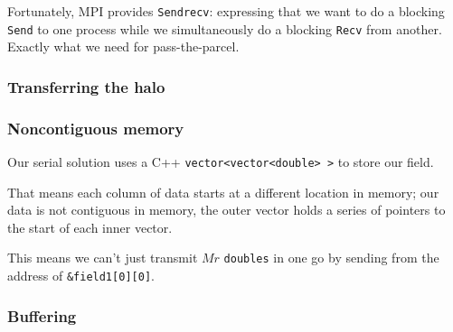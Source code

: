 Fortunately, MPI provides \texttt{Sendrecv}: expressing that we want to
do a blocking \texttt{Send} to one process while we simultaneously do a
blocking \texttt{Recv} from another. Exactly what we need for
pass-the-parcel.

\subsubsection{Transferring the halo}\label{transferring-the-halo-1}

\begin{Shaded}
\begin{Highlighting}[]

 
\NormalTok{\}}
\end{Highlighting}
\end{Shaded}

\subsubsection{Noncontiguous memory}\label{noncontiguous-memory}

Our serial solution uses a C++
\texttt{vector\textless{}vector\textless{}double\textgreater{} \textgreater{}}
to store our field.

That means each column of data starts at a different location in memory;
our data is not contiguous in memory, the outer vector holds a series of
pointers to the start of each inner vector.

This means we can't just transmit $Mr$ \texttt{doubles} in one go by
sending from the address of \texttt{\&field1{[}0{]}{[}0{]}}.

\subsubsection{Buffering}\label{buffering}

